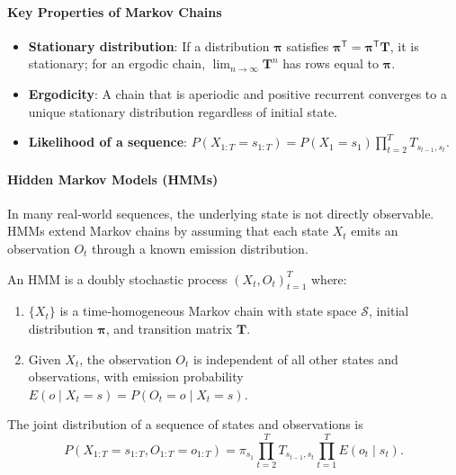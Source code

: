 \documentclass{tufte-handout}
\begin{document}
\paragraph{Key Properties of Markov Chains}
\begin{itemize}
    \item \textbf{Stationary distribution}: If a distribution $\boldsymbol{\pi}$ satisfies $\boldsymbol{\pi}^{\mathsf{T}} = \boldsymbol{\pi}^{\mathsf{T}} \mathbf{T}$, it is stationary; for an ergodic chain, $\lim_{n\to\infty} \mathbf{T}^n$ has rows equal to $\boldsymbol{\pi}$.
    \item \textbf{Ergodicity}: A chain that is aperiodic and positive recurrent converges to a unique stationary distribution regardless of initial state.
    \item \textbf{Likelihood of a sequence}: $P(X_{1:T}=s_{1:T}) = P(X_1=s_1) \prod_{t=2}^T T_{s_{t-1}, s_t}$.
\end{itemize}

\paragraph{Hidden Markov Models (HMMs)}
In many real‑world sequences, the underlying state is not directly observable. HMMs extend Markov chains by assuming that each state $X_t$ emits an observation $O_t$ through a known emission distribution.

\begin{defn}
    An HMM is a doubly stochastic process $(X_t, O_t)_{t=1}^T$ where:
    \begin{enumerate}
        \item $\{X_t\}$ is a time‑homogeneous Markov chain with state space $\mathcal{S}$, initial distribution $\boldsymbol{\pi}$, and transition matrix $\mathbf{T}$.
        \item Given $X_t$, the observation $O_t$ is independent of all other states and observations, with emission probability $E(o \mid X_t=s) = P(O_t=o \mid X_t=s)$.
    \end{enumerate}
    The joint distribution of a sequence of states and observations is
    \[
    P(X_{1:T}=s_{1:T}, O_{1:T}=o_{1:T}) = \pi_{s_1} \prod_{t=2}^T T_{s_{t-1}, s_t} \prod_{t=1}^T E(o_t \mid s_t).
    \]
\end{defn}

\begin{marginfigure}
\centering
{}
\caption{Graphical model of an HMM: hidden states $X_t$ (circle) emit observations $O_t$ (square).}
\end{marginfigure}
\end{document}
